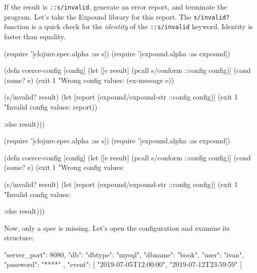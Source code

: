 If the result is \verb|::s/invalid|, generate an error report, and terminate the program. Let's take the Expound library for this report. The \verb|s/invalid?| function is a quick check for the \emph{identity} of the \verb|::s/invalid| keyword. Identity is faster than equality.

\ifx\DEVICETYPE\MOBILE

\begin{english}
  \begin{clojure}
(require '[clojure.spec.alpha :as s])
(require '[expound.alpha :as expound])

(defn coerce-config [config]
  (let [[e result] (pcall s/conform
                     ::config config)]
    (cond
      (some? e)
      (exit 1 "Wrong config values: %
        (ex-message e))

      (s/invalid? result)
      (let [report (expound/expound-str
                     ::config config)]
        (exit 1
          "Invalid config values: %
          \newline report))

      :else result)))
  \end{clojure}
\end{english}

\else

\begin{english}
  \begin{clojure}
(require '[clojure.spec.alpha :as s])
(require '[expound.alpha :as expound])

(defn coerce-config [config]
  (let [[e result] (pcall s/conform ::config config)]
    (cond
      (some? e)
      (exit 1 "Wrong config values: %

      (s/invalid? result)
      (let [report (expound/expound-str ::config config)]
        (exit 1 "Invalid config values: %

      :else result)))
  \end{clojure}
\end{english}

\fi

Now, only a spec is missing. Let's open the configuration and examine its structure:


\begin{english}
  \begin{json}
{
    "server_port": 8080,
    "db": {
        "dbtype":   "mysql",
        "dbname":   "book",
        "user":     "ivan",
        "password": "****"
    },
    "event": [
        "2019-07-05T12:00:00",
        "2019-07-12T23:59:59"
    ]
}
  \end{json}
\end{english}


